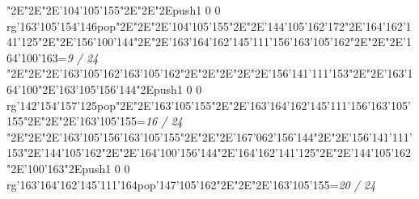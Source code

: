 \null\vfill\enskip\enskip\enskip\ipa\char"2E\enskip\enskip\enskip\ipa\char"2E\enskip\ipa\char"2E\enskip\enskip\enskip\bigskip\ipa\char'104\ipa\char'105\ipa\char'155\ipa\char"2E\enskip\enskip\enskip\ipa\char"2E\enskip\enskip\enskip\enskip\enskip\enskip\bigskip\enskip\enskip\ipa\char"2E\pdfcolorstack\match push{1 0 0 rg}\ipa\char'163\ipa\char'105\ipa\char'154\ipa\char'146\pdfcolorstack\match pop{}\ipa\char"2E\enskip\ipa\char"2E\enskip\enskip\enskip\enskip\ipa\char"2E\ipa\char'104\ipa\char'105\ipa\char'155\ipa\char"2E\enskip\enskip\enskip\ipa\char"2E\ipa\char'144\ipa\char'105\ipa\char'162\ipa\char'172\bigskip\enskip\ipa\char"2E\ipa\char'164\ipa\char'162\ipa\char'141\ipa\char'125\ipa\char"2E\enskip\enskip\ipa\char"2E\ipa\char'156\ipa\char'100\ipa\char'144\ipa\char"2E\enskip\enskip\ipa\char"2E\ipa\char'163\ipa\char'164\ipa\char'162\ipa\char'145\ipa\char'111\ipa\char'156\bigskip\ipa\char'163\ipa\char'105\ipa\char'162\ipa\char"2E\enskip\enskip\ipa\char"2E\enskip\enskip\enskip\ipa\char"2E\ipa\char'164\ipa\char'100\ipa\char'163\bigskip\vfill\footline={\hfill\tenrm\it 9 / 24}\eject
\null\vfill\enskip\enskip\enskip\ipa\char"2E\enskip\enskip\enskip\ipa\char"2E\enskip\ipa\char"2E\ipa\char'163\ipa\char'105\ipa\char'162\bigskip\ipa\char'163\ipa\char'105\ipa\char'162\ipa\char"2E\enskip\enskip\enskip\ipa\char"2E\enskip\enskip\enskip\enskip\enskip\enskip\bigskip\enskip\enskip\ipa\char"2E\enskip\enskip\enskip\enskip\ipa\char"2E\enskip\ipa\char"2E\ipa\char'156\ipa\char'141\ipa\char'111\ipa\char'153\ipa\char"2E\enskip\enskip\enskip\ipa\char"2E\ipa\char'163\ipa\char'164\ipa\char'100\ipa\char"2E\ipa\char'163\ipa\char'105\ipa\char'156\ipa\char'144\bigskip\enskip\ipa\char"2E\pdfcolorstack\match push{1 0 0 rg}\ipa\char'142\ipa\char'154\ipa\char'157\ipa\char'125\pdfcolorstack\match pop{}\ipa\char"2E\enskip\enskip\ipa\char"2E\ipa\char'163\ipa\char'105\ipa\char'155\ipa\char"2E\enskip\enskip\ipa\char"2E\ipa\char'163\ipa\char'164\ipa\char'162\ipa\char'145\ipa\char'111\ipa\char'156\bigskip\ipa\char'163\ipa\char'105\ipa\char'155\ipa\char"2E\enskip\enskip\ipa\char"2E\enskip\enskip\enskip\ipa\char"2E\ipa\char'163\ipa\char'105\ipa\char'155\bigskip\vfill\footline={\hfill\tenrm\it 16 / 24}\eject
\null\vfill\enskip\enskip\enskip\ipa\char"2E\enskip\enskip\enskip\ipa\char"2E\enskip\ipa\char"2E\ipa\char'163\ipa\char'105\ipa\char'156\bigskip\ipa\char'163\ipa\char'105\ipa\char'155\ipa\char"2E\enskip\enskip\enskip\ipa\char"2E\enskip\enskip\enskip\enskip\enskip\enskip\bigskip\enskip\enskip\ipa\char"2E\ipa\char'167\ipa\char'062\ipa\char'156\ipa\char'144\ipa\char"2E\enskip\ipa\char"2E\ipa\char'156\ipa\char'141\ipa\char'111\ipa\char'153\ipa\char"2E\ipa\char'144\ipa\char'105\ipa\char'162\ipa\char"2E\enskip\enskip\enskip\ipa\char"2E\ipa\char'164\ipa\char'100\ipa\char'156\ipa\char'144\bigskip\enskip\ipa\char"2E\ipa\char'164\ipa\char'162\ipa\char'141\ipa\char'125\ipa\char"2E\enskip\enskip\ipa\char"2E\ipa\char'144\ipa\char'105\ipa\char'162\ipa\char"2E\ipa\char'100\ipa\char'163\ipa\char"2E\pdfcolorstack\match push{1 0 0 rg}\ipa\char'163\ipa\char'164\ipa\char'162\ipa\char'145\ipa\char'111\ipa\char'164\pdfcolorstack\match pop{}\bigskip\ipa\char'147\ipa\char'105\ipa\char'162\ipa\char"2E\enskip\enskip\ipa\char"2E\enskip\enskip\enskip\ipa\char"2E\ipa\char'163\ipa\char'105\ipa\char'155\bigskip\vfill\footline={\hfill\tenrm\it 20 / 24}\eject
